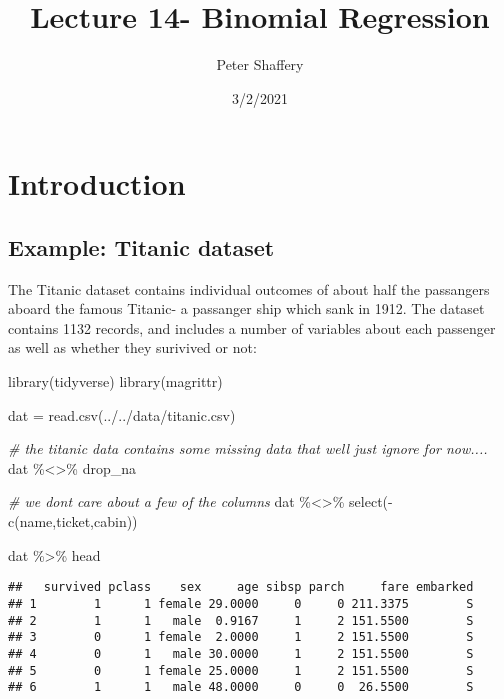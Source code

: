 \documentclass[
]{article}
\title{Lecture 14- Binomial Regression}
\author{Peter Shaffery}
\date{3/2/2021}
\newenvironment{Shaded}{\begin{snugshade}}{\end{snugshade}}
\newcommand{\CommentTok}[1]{\textcolor[rgb]{0.56,0.35,0.01}{\textit{#1}}}
\newcommand{\FunctionTok}[1]{\textcolor[rgb]{0.00,0.00,0.00}{#1}}
\newcommand{\NormalTok}[1]{#1}
\newcommand{\OtherTok}[1]{\textcolor[rgb]{0.56,0.35,0.01}{#1}}
\newcommand{\SpecialCharTok}[1]{\textcolor[rgb]{0.00,0.00,0.00}{#1}}
\newcommand{\StringTok}[1]{\textcolor[rgb]{0.31,0.60,0.02}{#1}}
\begin{document}
\maketitle

\hypertarget{introduction}{%
\section{Introduction}\label{introduction}}

\hypertarget{example-titanic-dataset}{%
\subsection{Example: Titanic dataset}\label{example-titanic-dataset}}

The Titanic dataset contains individual outcomes of about half the
passangers aboard the famous Titanic- a passanger ship which sank in
1912. The dataset contains 1132 records, and includes a number of
variables about each passenger as well as whether they surivived or not:

\begin{Shaded}
\begin{Highlighting}[]
\FunctionTok{library}\NormalTok{(tidyverse)}
\FunctionTok{library}\NormalTok{(magrittr)}

\NormalTok{dat }\OtherTok{=} \FunctionTok{read.csv}\NormalTok{(}\StringTok{\textquotesingle{}../../data/titanic.csv\textquotesingle{}}\NormalTok{)}

\CommentTok{\# the titanic data contains some missing data that we\textquotesingle{}ll just ignore for now....}
\NormalTok{dat }\SpecialCharTok{\%\textless{}\textgreater{}\%}\NormalTok{ drop\_na}

\CommentTok{\# we don\textquotesingle{}t care about a few of the columns}
\NormalTok{dat }\SpecialCharTok{\%\textless{}\textgreater{}\%} \FunctionTok{select}\NormalTok{(}\SpecialCharTok{{-}}\FunctionTok{c}\NormalTok{(}\StringTok{\textquotesingle{}name\textquotesingle{}}\NormalTok{,}\StringTok{\textquotesingle{}ticket\textquotesingle{}}\NormalTok{,}\StringTok{\textquotesingle{}cabin\textquotesingle{}}\NormalTok{))}

\NormalTok{dat }\SpecialCharTok{\%\textgreater{}\%}\NormalTok{ head}
\end{Highlighting}
\end{Shaded}

\begin{verbatim}
##   survived pclass    sex     age sibsp parch     fare embarked
## 1        1      1 female 29.0000     0     0 211.3375        S
## 2        1      1   male  0.9167     1     2 151.5500        S
## 3        0      1 female  2.0000     1     2 151.5500        S
## 4        0      1   male 30.0000     1     2 151.5500        S
## 5        0      1 female 25.0000     1     2 151.5500        S
## 6        1      1   male 48.0000     0     0  26.5500        S
\end{verbatim}
\end{document}

